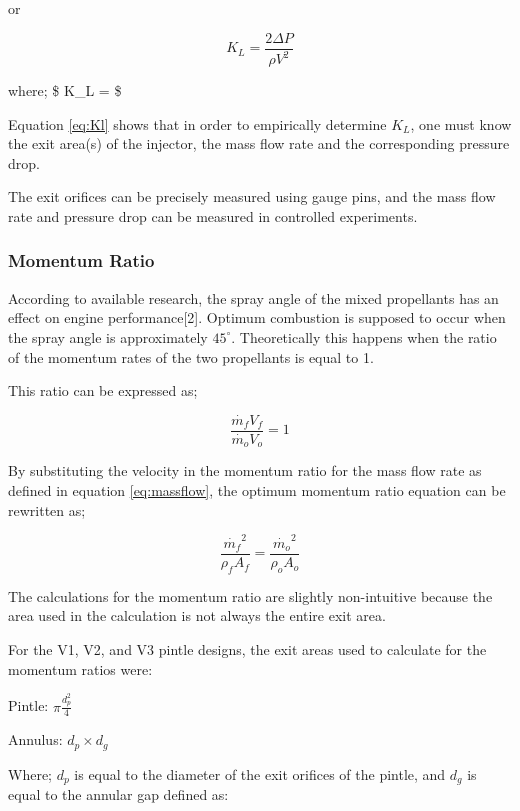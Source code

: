 \documentclass[11pt]{article}
\begin{document}
or

\begin{equation}
K_L = \frac{2\Delta P}{\rho V^2}
\label{eq:Kl alt}
\tag{8}
\end{equation}

where; \$ K\_L = \$

Equation \ref{eq:Kl} shows that in order to empirically determine
\(K_L\), one must know the exit area(s) of the injector, the mass flow
rate and the corresponding pressure drop.

The exit orifices can be precisely measured using gauge pins, and the
mass flow rate and pressure drop can be measured in controlled
experiments.

\subsubsection{Momentum Ratio}\label{momentum-ratio}

According to available research, the spray angle of the mixed
propellants has an effect on engine performance{[}2{]}. Optimum
combustion is supposed to occur when the spray angle is approximately
\(45^\circ\). Theoretically this happens when the ratio of the momentum
rates of the two propellants is equal to 1.

This ratio can be expressed as;

\begin{equation}
\frac{\dot{m_f}V_f}{\dot{m_o}V_o} = 1
\label{eq:momentum}
\tag{9}
\end{equation}

By substituting the velocity in the momentum ratio for the mass flow
rate as defined in equation \ref{eq:massflow}, the optimum momentum
ratio equation can be rewritten as;

\begin{equation}
\frac{\dot{m_f}^2}{\rho_f A_f} = \frac{\dot{m_o}^2}{\rho_o A_o}
\label{eq:momentum_alt}
\tag{10}
\end{equation}

The calculations for the momentum ratio are slightly non-intuitive
because the area used in the calculation is not always the entire exit
area.

For the V1, V2, and V3 pintle designs, the exit areas used to calculate
for the momentum ratios were:

Pintle: \(\pi \frac{d_p^2}{4}\)

Annulus: \(d_p\times d_g\)

Where; \(d_p\) is equal to the diameter of the exit orifices of the
pintle, and \(d_g\) is equal to the annular gap defined as:
\end{document}
